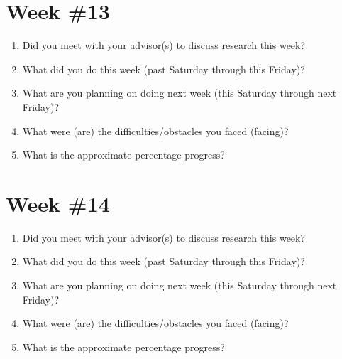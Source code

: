 \documentclass[letterpaper,12pt,fleqn]{article}
\begin{document}
\clearpage
\section*{Week \#13}

\begin{spacing}{1.50}
  \begin{enumerate}
    \item Did you meet with your advisor(s) to discuss research this week?
          \vfill

    \item What did you do this week (past Saturday through this Friday)? 
          \vfill

    \item What are you planning on doing next week (this Saturday through next Friday)? 
          \vfill

    \item What were (are) the difficulties/obstacles you faced (facing)?
          \vfill

    \item What is the approximate percentage progress?
          \vfill
  \end{enumerate}
\end{spacing}

\clearpage
\section*{Week \#14}

\begin{spacing}{1.50}
  \begin{enumerate}
    \item Did you meet with your advisor(s) to discuss research this week?
          \vfill

    \item What did you do this week (past Saturday through this Friday)? 
          \vfill

    \item What are you planning on doing next week (this Saturday through next Friday)? 
          \vfill

    \item What were (are) the difficulties/obstacles you faced (facing)?
          \vfill

    \item What is the approximate percentage progress?
          \vfill
  \end{enumerate}
\end{spacing}

\end{document}

